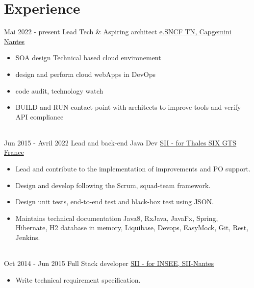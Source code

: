 \documentclass[letterpaper]{twentysecondcv} %
\begin{document}
\makeprofile %


\section{Experience}

\begin{twenty} %
\twentyitem
	{Mai 2022 -}
	{present}
{Lead Tech \& Aspiring architect}
{\href{https://www.transilien.com/fr}{e.SNCF TN, Capgemini Nantes}}
{}
{\begin{itemize}	
		\item SOA design Technical based cloud environement
		\item design and perform cloud webApps in DevOps
		\item code audit, technology watch
		\item BUILD and RUN contact point with architects to improve tools and verify API compliance
\end{itemize}}
	\\
	\twentyitem
	{Jun 2015 -}
	{Avril 2022}
        {Lead and back-end Java Dev}
        {\href{https://www.thalesgroup.com/fr}{SII - for Thales SIX GTS France}}
        {}
        {\begin{itemize} 
    		\item Lead and contribute to the implementation of improvements and PO support.
    		\item Design and develop following the Scrum, squad-team framework.
    		\item Design unit tests, end-to-end test and black-box test using JSON.
		\item Maintains technical documentation
		\medskip   \newline \footnotesize  Java8, RxJava, JavaFx, Spring, Hibernate, H2 database in memory, Liquibase, Devops, EasyMock, Git, Rest, Jenkins.
        \end{itemize}}
        \\
	\twentyitem
    	{Oct 2014 -}
		{Jun 2015}
        {Full Stack developer}
        {\href{https://www.insee.fr/fr/accueil}{SII - for INSEE, SII-Nantes}}
        {}
        {
        {\begin{itemize}
		\item Write technical requirement specification.

\end{itemize}}}
\end{twenty}
\end{document}
